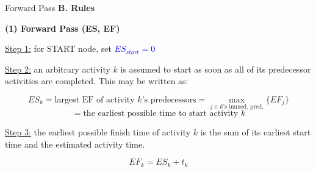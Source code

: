 \documentclass[11pt,aspectratio=169]{beamer}
\begin{document}
\begin{frame}{Forward Pass}
    \textbf{B. Rules}
    \vspace{0.5em}
    
    \textbf{(1) Forward Pass (ES, EF)}
    
    \underline{Step 1:} for START node, set \textcolor{blue}{$ES_{start} = 0$}
    
    \vspace{1em}
    \underline{Step 2:} an arbitrary activity $k$ is assumed to start as soon as all of its predecessor activities are completed. This may be written as:
    
    $$ES_k = \text{largest EF of activity } k\text{'s predecessors} = \max_{j \in k\text{'s immed. pred.}} \{EF_j\}$$
    $$ = \text{the earliest possible time to start activity } k$$
    
    \vspace{1em}
    \underline{Step 3:} the earliest possible finish time of activity $k$ is the sum of its earliest start time and the estimated activity time.
    
    $$EF_k = ES_k + t_k$$
\end{frame}
\end{document}

